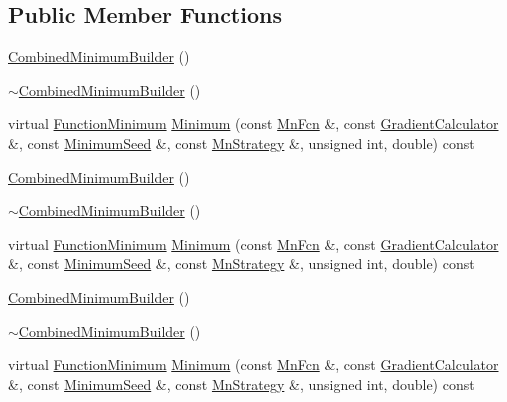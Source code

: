 \subsection*{Public Member Functions}
\begin{DoxyCompactItemize}
\item 
\mbox{\hyperlink{classROOT_1_1Minuit2_1_1CombinedMinimumBuilder_aee1b78ff3ad13105a647bbccd6c92d2e}{Combined\+Minimum\+Builder}} ()
\item 
\mbox{\hyperlink{classROOT_1_1Minuit2_1_1CombinedMinimumBuilder_a50159966d74446223a77e638aad1dd44}{$\sim$\+Combined\+Minimum\+Builder}} ()
\item 
virtual \mbox{\hyperlink{classROOT_1_1Minuit2_1_1FunctionMinimum}{Function\+Minimum}} \mbox{\hyperlink{classROOT_1_1Minuit2_1_1CombinedMinimumBuilder_a44282b6271b536b7fc6b80af16ac67ef}{Minimum}} (const \mbox{\hyperlink{classROOT_1_1Minuit2_1_1MnFcn}{Mn\+Fcn}} \&, const \mbox{\hyperlink{classROOT_1_1Minuit2_1_1GradientCalculator}{Gradient\+Calculator}} \&, const \mbox{\hyperlink{classROOT_1_1Minuit2_1_1MinimumSeed}{Minimum\+Seed}} \&, const \mbox{\hyperlink{classROOT_1_1Minuit2_1_1MnStrategy}{Mn\+Strategy}} \&, unsigned int, double) const
\item 
\mbox{\hyperlink{classROOT_1_1Minuit2_1_1CombinedMinimumBuilder_aee1b78ff3ad13105a647bbccd6c92d2e}{Combined\+Minimum\+Builder}} ()
\item 
\mbox{\hyperlink{classROOT_1_1Minuit2_1_1CombinedMinimumBuilder_a50159966d74446223a77e638aad1dd44}{$\sim$\+Combined\+Minimum\+Builder}} ()
\item 
virtual \mbox{\hyperlink{classROOT_1_1Minuit2_1_1FunctionMinimum}{Function\+Minimum}} \mbox{\hyperlink{classROOT_1_1Minuit2_1_1CombinedMinimumBuilder_a5439a04b01ff94a8f790443b867d6e53}{Minimum}} (const \mbox{\hyperlink{classROOT_1_1Minuit2_1_1MnFcn}{Mn\+Fcn}} \&, const \mbox{\hyperlink{classROOT_1_1Minuit2_1_1GradientCalculator}{Gradient\+Calculator}} \&, const \mbox{\hyperlink{classROOT_1_1Minuit2_1_1MinimumSeed}{Minimum\+Seed}} \&, const \mbox{\hyperlink{classROOT_1_1Minuit2_1_1MnStrategy}{Mn\+Strategy}} \&, unsigned int, double) const
\item 
\mbox{\hyperlink{classROOT_1_1Minuit2_1_1CombinedMinimumBuilder_aee1b78ff3ad13105a647bbccd6c92d2e}{Combined\+Minimum\+Builder}} ()
\item 
\mbox{\hyperlink{classROOT_1_1Minuit2_1_1CombinedMinimumBuilder_a50159966d74446223a77e638aad1dd44}{$\sim$\+Combined\+Minimum\+Builder}} ()
\item 
virtual \mbox{\hyperlink{classROOT_1_1Minuit2_1_1FunctionMinimum}{Function\+Minimum}} \mbox{\hyperlink{classROOT_1_1Minuit2_1_1CombinedMinimumBuilder_a5439a04b01ff94a8f790443b867d6e53}{Minimum}} (const \mbox{\hyperlink{classROOT_1_1Minuit2_1_1MnFcn}{Mn\+Fcn}} \&, const \mbox{\hyperlink{classROOT_1_1Minuit2_1_1GradientCalculator}{Gradient\+Calculator}} \&, const \mbox{\hyperlink{classROOT_1_1Minuit2_1_1MinimumSeed}{Minimum\+Seed}} \&, const \mbox{\hyperlink{classROOT_1_1Minuit2_1_1MnStrategy}{Mn\+Strategy}} \&, unsigned int, double) const
\end{DoxyCompactItemize}


